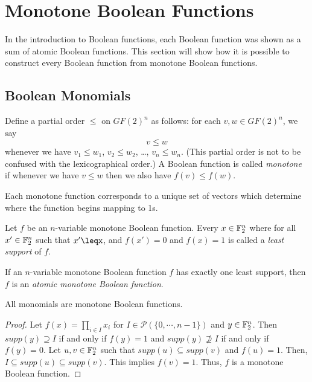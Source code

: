 \section{Monotone Boolean Functions}
\par In the introduction to Boolean functions, each Boolean function was
shown as a sum of atomic Boolean functions. This section will show how it is
possible to construct every Boolean function from monotone Boolean
functions.

\subsection{Boolean Monomials}
Define a partial order $\leq $ on $GF(2)^n$ as follows:
for each $v,w\in GF(2)^n$, we say 
\[
v\leq w
\]
whenever we have $v_1 \leq w_1$, $v_2 \leq w_2$, \dots, $v_n \leq w_n$.
(This partial order is not to be confused with the lexicographical order.)
A Boolean function is called {\it monotone} if whenever we have $v\leq w$
then we also have $f(v) \leq f(w)$. 

\par Each monotone function corresponds to a unique set of vectors which
determine where the function begins mapping to 1s.

\begin{definition}
  Let $f$ be an $n$-variable monotone Boolean function. Every $x\in\mathbb{F}_2^n$
  where for all $x'\in\mathbb{F}_2^n$ such that $x'\leqx$, and $f(x')=0$ and
  $f(x)=1$ is called a \textit{least support} of $f$.
\end{definition}

\begin{definition}
  If an $n$-variable monotone Boolean function $f$ has exactly one least
  support, then $f$ is an \textit{atomic monotone Boolean function}.
\end{definition}

\begin{theorem}
  All monomials are monotone Boolean functions.
\end{theorem}

\begin{proof}
  Let $f(x)=\prod_{i\in I}x_i$ for $I\in\mathcal{P}(\{0,\cdots,n-1\})$ and
  $y\in\mathbb{F}_2^n$. Then $supp(y)\supseteq I$ if and only if $f(y)=1$ and
  $supp(y) \not\supseteq I$ if and only if $f(y)=0$.
  Let $u,v\in\mathbb{F}_2^n$ such that $supp(u)\subseteq supp(v)$ and $f(u)=1$.
  Then, $I\subseteq supp(u) \subseteq supp(v)$. This implies $f(v)=1$. Thus,
  $f$ is a monotone Boolean function.
\end{proof}

